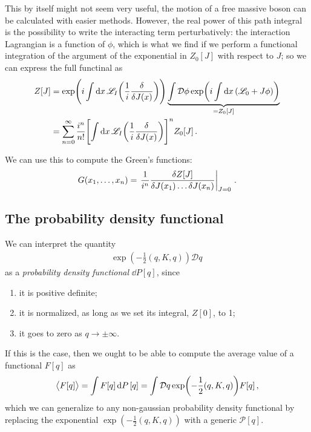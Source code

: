 \documentclass[main.tex]{subfiles}
\begin{document}
This by itself might not seem very useful, the motion of a free massive boson can be calculated with easier methods.
However, the real power of this path integral is the possibility to write the interacting term perturbatively: the interaction Lagrangian is a function of \(\phi \), which is what we find if we perform a functional integration of the argument of the exponential in \(Z_0 [J]\) with respect to \(J\); so we can express the full functinal as 
%
\begin{align}
Z[J] &= \exp( i\int \dd{x} \mathscr{L}_I\qty( \frac{1}{i} \fdv{}{J(x)}))
\underbrace{\int \mathcal{D} \phi \exp(i \int \dd{x} \qty( \mathscr{L}_0 + J \phi )) }_{= Z_0 [J]}  \\
&= \sum _{n=0}^{\infty } \frac{i^{n}}{n!} \qty[ \int \dd{x} \mathscr{L}_I\qty(\frac{1}{i} \fdv{}{J(x)})]^{n} Z_0 [J]
\,.
\end{align}

We can use this to compute the Green's functions: 
%
\begin{align}
G(x_1 , \dots , x_n) = \eval{\frac{1}{i^{n}} \frac{ \delta Z[J]}{ \delta J (x_1 ) \dots \delta J(x_n)}}_{J = 0}
\,.
\end{align}


\subsection{The probability density functional}

We can interpret the quantity 
%
\begin{align}
\exp(- \frac{1}{2} (q, K, q)) \mathcal{D}q
\,
\end{align}
%
as a \emph{probability density functional} \(\dd{P}[q]\), since 
\begin{enumerate}
    \item it is positive definite;
    \item it is normalized, as long as we set its integral, \(Z[0]\), to 1;
    \item it goes to zero as \(q \to \pm \infty \).
\end{enumerate}

If this is the case, then we ought to be able to compute the average value of a functional \(F[q]\) as 
%
\begin{align}
\expval{F[q]} = \int F[q] \dd{P}[q] = \int \mathcal{D}q \exp(- \frac{1}{2} (q, K, q)) F[q]  
\,,
\end{align}
%
which we can generalize to any non-gaussian probability density functional by replacing the exponential \(\exp(- \frac{1}{2} (q, K, q))\) with a generic \(\mathcal{P}[q]\).
\end{document}
